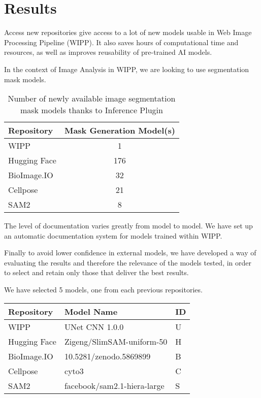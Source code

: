 \section{Results}
\label{sec:results}

Access new repositories give access to a lot of new models usable in Web Image
Processing Pipeline (WIPP). It also saves hours of computational time and
resources, as well as improves reusability of pre-trained AI models.

In the context of Image Analysis in WIPP, we are looking to use segmentation
mask models.

\begin{table}[H]
\centering
\caption{\label{tab:number_of_newly_available_models}%
  Number of newly available image segmentation mask models thanks to Inference Plugin
}
\begin{tabular}{lc}
  \toprule
  Repository & Mask Generation Model(s) \\
  \midrule
  WIPP & 1 \\
  Hugging Face & 176 \\
  BioImage.IO & 32 \\
  Cellpose & 21 \\
  SAM2 & 8 \\
  \bottomrule
\end{tabular}
\end{table}

The level of documentation varies greatly from model to model. We have set up an
automatic documentation system for models trained within WIPP.

Finally to avoid lower confidence in external models, we have developed a way of
evaluating the results and therefore the relevance of the models tested, in
order to select and retain only those that deliver the best results.

We have selected 5 models, one from each previous repositories.

\begin{table}[H]
\centering
\begin{tabular}{lll}
  \toprule
  Repository & Model Name & ID \\
  \midrule
  WIPP & UNet CNN 1.0.0 & U \\
  Hugging Face & Zigeng/SlimSAM-uniform-50 & H \\
  BioImage.IO & 10.5281/zenodo.5869899 & B \\
  Cellpose & cyto3 & C \\
  SAM2 & facebook/sam2.1-hiera-large & S \\
  \bottomrule
\end{tabular}
\end{table}

